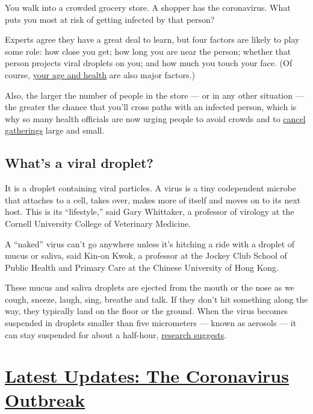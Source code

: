 You walk into a crowded grocery store. A shopper has the coronavirus.
What puts you most at risk of getting infected by that person?

Experts agree they have a great deal to learn, but four factors are
likely to play some role: how close you get; how long you are near the
person; whether that person projects viral droplets on you; and how much
you touch your face. (Of course,
\href{https://www.nytimes3xbfgragh.onion/2020/02/20/health/coronavirus-men-women.html}{your
age and health} are also major factors.)

Also, the larger the number of people in the store --- or in any other
situation --- the greater the chance that you'll cross paths with an
infected person, which is why so many health officials are now urging
people to avoid crowds and to
\href{https://www.cdc.gov/coronavirus/2019-ncov/community/large-events/mass-gatherings-ready-for-covid-19.html}{cancel
gatherings} large and small.

\hypertarget{whats-a-viral-droplet}{%
\subsection{What's a viral droplet?}\label{whats-a-viral-droplet}}

It is a droplet containing viral particles. A virus is a tiny
codependent microbe that attaches to a cell, takes over, makes more of
itself and moves on to its next host. This is its ``lifestyle,'' said
Gary Whittaker, a professor of virology at the Cornell University
College of Veterinary Medicine.

A ``naked'' virus can't go anywhere unless it's hitching a ride with a
droplet of mucus or saliva, said Kin-on Kwok, a professor at the Jockey
Club School of Public Health and Primary Care at the Chinese University
of Hong Kong.

These mucus and saliva droplets are ejected from the mouth or the nose
as we cough, sneeze, laugh, sing, breathe and talk. If they don't hit
something along the way, they typically land on the floor or the ground.
When the virus becomes suspended in droplets smaller than five
micrometers --- known as aerosols --- it can stay suspended for about a
half-hour,
\href{https://www.nytimes3xbfgragh.onion/2020/03/17/health/coronavirus-surfaces-aerosols.html}{research
suggests}.

\hypertarget{latest-updates-the-coronavirus-outbreak}{%
\section{\texorpdfstring{\href{https://www.nytimes3xbfgragh.onion/2020/08/20/world/coronavirus-covid.html?action=click\&pgtype=Article\&state=default\&region=MAIN_CONTENT_1\&context=storylines_live_updates}{Latest
Updates: The Coronavirus
Outbreak}}{Latest Updates: The Coronavirus Outbreak}}\label{latest-updates-the-coronavirus-outbreak}}

